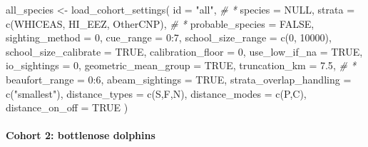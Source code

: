 \documentclass[
]{book}
\newenvironment{Shaded}{\begin{snugshade}}{\end{snugshade}}
\newcommand{\AttributeTok}[1]{\textcolor[rgb]{0.77,0.63,0.00}{#1}}
\newcommand{\CommentTok}[1]{\textcolor[rgb]{0.56,0.35,0.01}{\textit{#1}}}
\newcommand{\ConstantTok}[1]{\textcolor[rgb]{0.00,0.00,0.00}{#1}}
\newcommand{\DecValTok}[1]{\textcolor[rgb]{0.00,0.00,0.81}{#1}}
\newcommand{\FloatTok}[1]{\textcolor[rgb]{0.00,0.00,0.81}{#1}}
\newcommand{\FunctionTok}[1]{\textcolor[rgb]{0.00,0.00,0.00}{#1}}
\newcommand{\NormalTok}[1]{#1}
\newcommand{\OtherTok}[1]{\textcolor[rgb]{0.56,0.35,0.01}{#1}}
\newcommand{\SpecialCharTok}[1]{\textcolor[rgb]{0.00,0.00,0.00}{#1}}
\newcommand{\StringTok}[1]{\textcolor[rgb]{0.31,0.60,0.02}{#1}}
\begin{document}
\begin{Shaded}
\begin{Highlighting}[]
\NormalTok{all\_species }\OtherTok{\textless{}{-}} \FunctionTok{load\_cohort\_settings}\NormalTok{(}
  \AttributeTok{id =} \StringTok{"all"}\NormalTok{, }\CommentTok{\# *}
  \AttributeTok{species =} \ConstantTok{NULL}\NormalTok{, }
  \AttributeTok{strata =} \FunctionTok{c}\NormalTok{(}\StringTok{\textquotesingle{}WHICEAS\textquotesingle{}}\NormalTok{, }\StringTok{\textquotesingle{}HI\_EEZ\textquotesingle{}}\NormalTok{, }\StringTok{\textquotesingle{}OtherCNP\textquotesingle{}}\NormalTok{), }\CommentTok{\# *}
  \AttributeTok{probable\_species =} \ConstantTok{FALSE}\NormalTok{,}
  \AttributeTok{sighting\_method =} \DecValTok{0}\NormalTok{,}
  \AttributeTok{cue\_range =} \DecValTok{0}\SpecialCharTok{:}\DecValTok{7}\NormalTok{,}
  \AttributeTok{school\_size\_range =} \FunctionTok{c}\NormalTok{(}\DecValTok{0}\NormalTok{, }\DecValTok{10000}\NormalTok{),}
  \AttributeTok{school\_size\_calibrate =} \ConstantTok{TRUE}\NormalTok{,}
  \AttributeTok{calibration\_floor =} \DecValTok{0}\NormalTok{,}
  \AttributeTok{use\_low\_if\_na =} \ConstantTok{TRUE}\NormalTok{,}
  \AttributeTok{io\_sightings =} \DecValTok{0}\NormalTok{,}
  \AttributeTok{geometric\_mean\_group =} \ConstantTok{TRUE}\NormalTok{,}
  \AttributeTok{truncation\_km =} \FloatTok{7.5}\NormalTok{, }\CommentTok{\# *}
  \AttributeTok{beaufort\_range =} \DecValTok{0}\SpecialCharTok{:}\DecValTok{6}\NormalTok{,}
  \AttributeTok{abeam\_sightings =} \ConstantTok{TRUE}\NormalTok{,}
  \AttributeTok{strata\_overlap\_handling =} \FunctionTok{c}\NormalTok{(}\StringTok{"smallest"}\NormalTok{),}
  \AttributeTok{distance\_types =} \FunctionTok{c}\NormalTok{(}\StringTok{\textquotesingle{}S\textquotesingle{}}\NormalTok{,}\StringTok{\textquotesingle{}F\textquotesingle{}}\NormalTok{,}\StringTok{\textquotesingle{}N\textquotesingle{}}\NormalTok{),}
  \AttributeTok{distance\_modes =} \FunctionTok{c}\NormalTok{(}\StringTok{\textquotesingle{}P\textquotesingle{}}\NormalTok{,}\StringTok{\textquotesingle{}C\textquotesingle{}}\NormalTok{),}
  \AttributeTok{distance\_on\_off =} \ConstantTok{TRUE}
\NormalTok{)}
\end{Highlighting}
\end{Shaded}

\hypertarget{cohort-2-bottlenose-dolphins}{%
\paragraph*{Cohort 2: bottlenose dolphins}\label{cohort-2-bottlenose-dolphins}}
\end{document}
